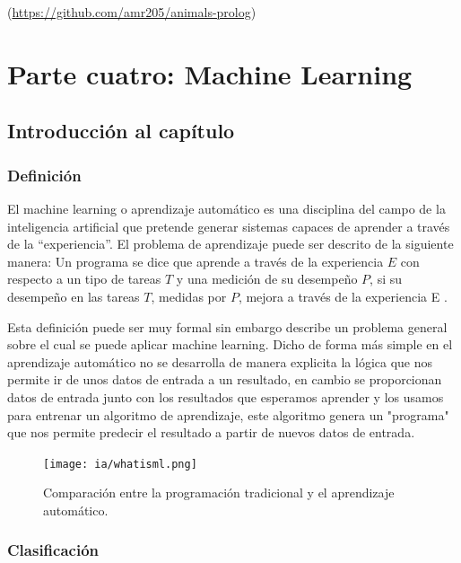\documentclass[11pt,fleqn]{book} %
\begin{document}
(\url{https://github.com/amr205/animals-prolog})

\part{Parte cuatro: Machine Learning}


\chapter{Introducción al capítulo}

\section{Definición} 

El machine learning o aprendizaje automático es una disciplina del campo de la inteligencia artificial que pretende generar sistemas capaces de aprender a través de la “experiencia”.
El problema de aprendizaje puede ser descrito de la siguiente manera: 
Un programa se dice que aprende a través de la experiencia $E$ con respecto a un tipo de tareas $T$ y una medición de su desempeño $P$, si su desempeño en las tareas $T$, medidas por $P$, mejora a través de la experiencia E \cite{mitchell1997machine}.

Esta definición puede ser muy formal sin embargo describe un problema general sobre el cual se puede aplicar machine learning. Dicho de forma más simple en el aprendizaje automático no se desarrolla de manera explicita la lógica que nos permite ir de unos datos de entrada a un resultado, en cambio se proporcionan datos de entrada junto con los resultados que esperamos aprender y los usamos para entrenar un algoritmo de aprendizaje, este algoritmo genera un "programa" que nos permite predecir el resultado a partir de nuevos datos de entrada.

\begin{figure}[ht]
\centering\texttt{[image: ia/whatisml.png]}
\caption{Comparación entre la programación tradicional y el aprendizaje automático.}

\label{fig:whatisml} 
\end{figure}

\FloatBarrier

\section{Clasificación} 
\end{document}
